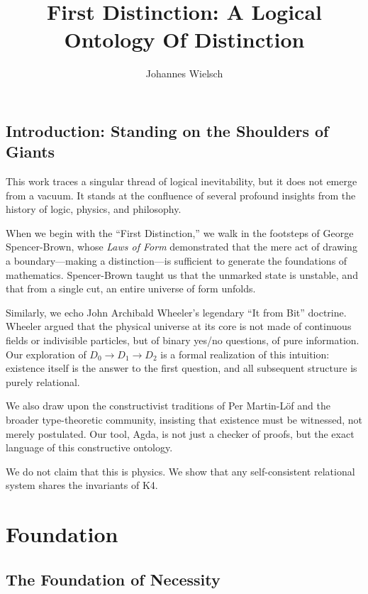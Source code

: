 \documentclass[11pt,a4paper]{book}
\begin{document}
\frontmatter
\title{First Distinction: A Logical Ontology Of Distinction}
\author{Johannes Wielsch}
\maketitle

\mainmatter

\chapter{Introduction: Standing on the Shoulders of Giants}

This work traces a singular thread of logical inevitability, but it does not emerge from a vacuum. It stands at the confluence of several profound insights from the history of logic, physics, and philosophy.

When we begin with the ``First Distinction,'' we walk in the footsteps of George Spencer-Brown, whose \textit{Laws of Form} demonstrated that the mere act of drawing a boundary—making a distinction—is sufficient to generate the foundations of mathematics. Spencer-Brown taught us that the unmarked state is unstable, and that from a single cut, an entire universe of form unfolds.

Similarly, we echo John Archibald Wheeler's legendary ``It from Bit'' doctrine. Wheeler argued that the physical universe at its core is not made of continuous fields or indivisible particles, but of binary yes/no questions, of pure information. Our exploration of $D_0 \to D_1 \to D_2$ is a formal realization of this intuition: existence itself is the answer to the first question, and all subsequent structure is purely relational.

We also draw upon the constructivist traditions of Per Martin-Löf and the broader type-theoretic community, insisting that existence must be witnessed, not merely postulated. Our tool, Agda, is not just a checker of proofs, but the exact language of this constructive ontology.

We do not claim that this is physics. We show that any self-consistent relational system shares the invariants of K4.

\part{Foundation}

\chapter{The Foundation of Necessity}
\end{document}
